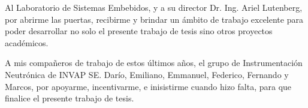 \documentclass[
11pt, %
spanish,
singlespacing, %
parskip, %
headsepline, %
]{MastersDoctoralThesis} %
\renewcommand{\listtablename}{Índice de Tablas}
\renewcommand{\tablename}{Tabla}
\begin{document}
\begin{acknowledgements}
Al Laboratorio de Sistemas Embebidos, y a su director Dr. Ing. Ariel Lutenberg, por abrirme las
puertas, recibirme y brindar un ámbito de trabajo excelente para poder desarrollar no solo el
presente trabajo de tesis sino otros proyectos académicos.

A mis compañeros de trabajo de estos últimos años, el grupo de Instrumentación Neutrónica de INVAP
SE. Darío, Emiliano, Emmanuel, Federico, Fernando y Marcos, por apoyarme, incentivarme, e
inisistirme cuando hizo falta, para que finalice el presente trabajo de tesis.

\end{acknowledgements}

\renewcommand{\listtablename}{Índice de Tablas}

\tableofcontents %

\listoffigures %

\listoftables %





\mainmatter %

\pagestyle{thesis} %

\renewcommand{\tablename}{Tabla} 





 

 
%

\end{document}

